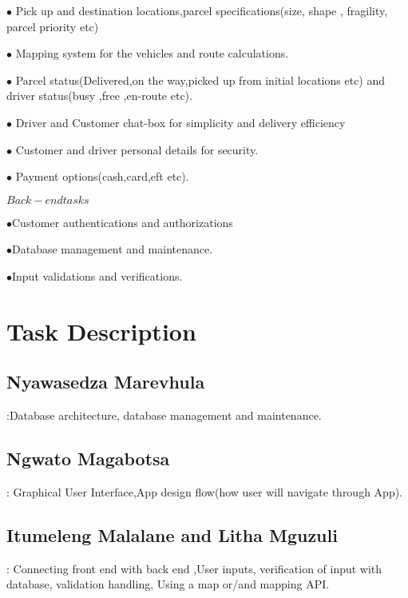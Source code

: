 \documentclass[a4paper]{article}
\begin{document}
$\bullet$ Pick up and destination locations,parcel specifications(size, shape , fragility, parcel priority etc)

$\bullet$ Mapping system for the vehicles and route calculations.

$\bullet$ Parcel status(Delivered,on the way,picked up from initial locations etc) and driver status(busy ,free ,en-route etc).

$\bullet$ Driver and Customer chat-box for simplicity and delivery efficiency

$\bullet$ Customer and driver personal details for security.

$\bullet$ Payment options(cash,card,eft etc).

$Back-end tasks$

$\bullet$Customer authentications and authorizations 

$\bullet$Database management and maintenance.

$\bullet$Input validations and verifications. 

\section{Task Description}
\subsection{Nyawasedza Marevhula}:Database architecture, database management and maintenance.

\subsection{Ngwato Magabotsa}: Graphical User Interface,App design flow(how user will navigate through App).

\subsection{Itumeleng Malalane and Litha Mguzuli}: Connecting front end with back end ,User inputs, verification of input with database, validation handling, Using a map or/and mapping API.
\end{document}
